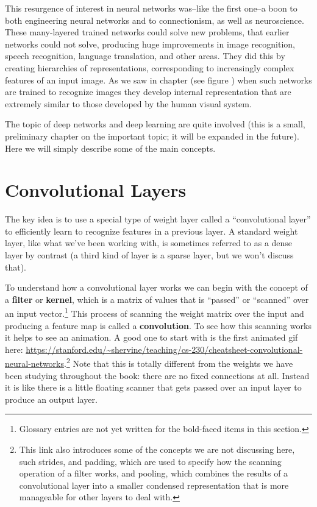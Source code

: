 This resurgence of interest  in neural networks was--like the first one--a boon to both engineering neural networks and to connectionism, as well as neuroscience. These many-layered trained networks could solve new problems, that earlier networks could not solve, producing huge improvements in image recognition, speech recognition, language translation, and other areas. They did this by creating hierarchies of representations, corresponding  to increasingly complex features of an input image. As we saw in chapter  (see figure ) when such networks are trained to recognize images they develop internal representation that are extremely similar to those developed by the human visual  system.

The topic of deep networks and deep learning are quite involved (this is a small, preliminary chapter on the important topic; it will be expanded in the future). Here we will simply describe some of the main concepts.

\section{Convolutional Layers}

The key idea is to use a special type of weight layer called a ``convolutional layer'' to efficiently learn to recognize features in a previous layer.  A standard weight layer, like what we've been working with, is sometimes referred to as a dense layer by contrast (a third kind of layer is a sparse layer, but we won't discuss that). 

To understand how a convolutional  layer works we can begin with the concept of a \textbf{filter} or \textbf{kernel}, which is a  matrix of values that is ``passed'' or ``scanned'' over an input vector.\footnote{Glossary entries are not yet written for the bold-faced items in this section.}  This process of scanning the weight matrix over the input and producing a feature map is called a \textbf{convolution}. To see how this scanning works it helps to see an animation. A good one to start with is the first animated gif here: \url{https://stanford.edu/~shervine/teaching/cs-230/cheatsheet-convolutional-neural-networks}.\footnote{This link also introduces some of the concepts we are not discussing here, such strides, and padding, which are used to specify how the scanning operation of a filter works, and pooling, which combines the results of a convolutional layer into a smaller  condensed representation that is more manageable for other layers to deal with.} Note that this is totally different from the weights we have been studying throughout the book: there are no fixed connections at all. Instead it is like there is a little floating scanner that gets passed over an input layer to produce an output layer.

